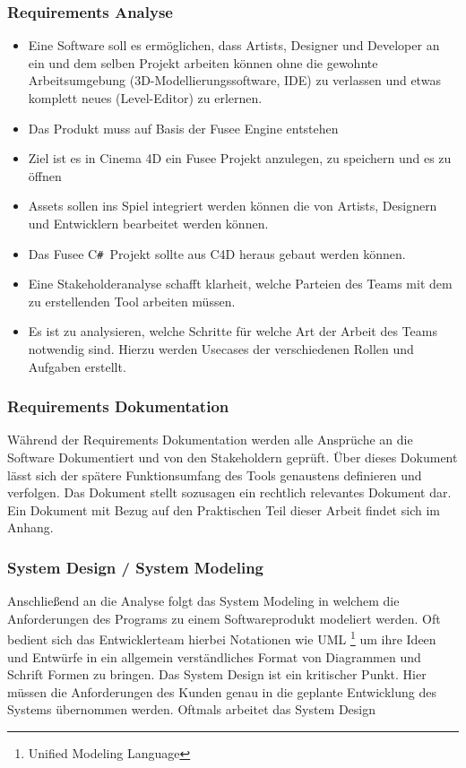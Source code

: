 \documentclass[pagesize, paper=a4, fontsize=12pt, titlepage=true, headings=small, headnosepline, abstractoff, liststotoc, nochapterprefix, plainheadsepline, twoside]{scrreprt}
\newcommand{\CSS}{C\texttt{\# }}
\begin{document}
\subsubsection{Requirements Analyse}
\begin{itemize}
\item Eine Software soll es ermöglichen, dass Artists, Designer und Developer an ein und dem selben Projekt arbeiten können ohne die gewohnte Arbeitsumgebung (3D-Modellierungssoftware, IDE) zu verlassen und etwas komplett neues (Level-Editor) zu erlernen.
\item Das Produkt muss auf Basis der Fusee Engine entstehen
\item Ziel ist es in Cinema 4D ein Fusee Projekt anzulegen, zu speichern und es zu öffnen
\item Assets sollen ins Spiel integriert werden können die von Artists, Designern und Entwicklern bearbeitet werden können.
\item Das Fusee \CSS Projekt sollte aus C4D heraus gebaut werden können.
\item Eine Stakeholderanalyse schafft klarheit, welche Parteien des Teams mit dem zu erstellenden Tool arbeiten müssen.
\item Es ist zu analysieren, welche Schritte für welche Art der Arbeit des Teams notwendig sind. Hierzu werden Usecases der verschiedenen Rollen und Aufgaben erstellt.
\end{itemize}
\subsubsection{Requirements Dokumentation}
Während der Requirements Dokumentation werden alle Ansprüche an die Software Dokumentiert und von den Stakeholdern geprüft. Über dieses Dokument lässt sich der spätere Funktionsumfang des Tools genaustens definieren und verfolgen. Das Dokument stellt sozusagen ein rechtlich relevantes Dokument dar. Ein Dokument mit Bezug auf den Praktischen Teil dieser Arbeit findet sich im Anhang.

\subsubsection{System Design / System Modeling}
Anschließend an die Analyse folgt das System Modeling in welchem die Anforderungen des Programs zu einem Softwareprodukt modeliert werden. Oft bedient sich das Entwicklerteam hierbei Notationen wie UML \footnote{Unified Modeling Language} um ihre Ideen und Entwürfe in ein allgemein verständliches Format von Diagrammen und Schrift Formen zu bringen. Das System Design ist ein kritischer Punkt. Hier müssen die Anforderungen des Kunden genau in die geplante Entwicklung des Systems übernommen werden. Oftmals arbeitet das System Design 
\end{document}
